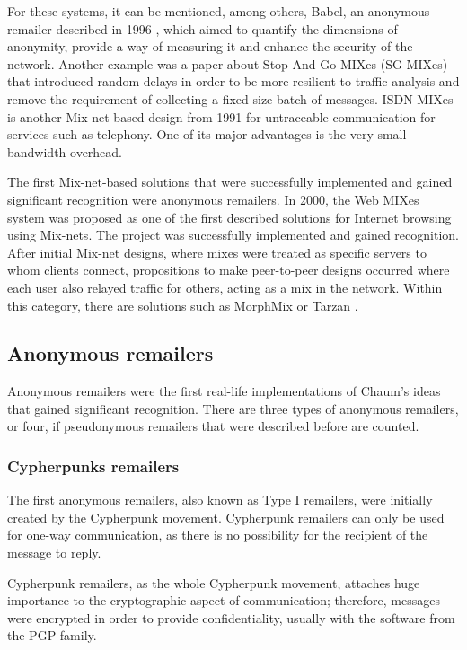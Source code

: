 For these systems, it can be mentioned, among others, Babel, an anonymous remailer described in 1996 \cite{babel}, which aimed to quantify the dimensions of anonymity, provide a way of measuring it and enhance the security of the network. Another example was a paper about Stop-And-Go MIXes (SG-MIXes) \cite{stop-and-go} that introduced random delays in order to be more resilient to traffic analysis and remove the requirement of collecting a fixed-size batch of messages.
ISDN-MIXes \cite{Pfitzmann91} is another Mix-net-based design from 1991 for untraceable communication for services such as telephony. One of its major advantages is the very small bandwidth overhead.

The first Mix-net-based solutions that were successfully implemented and gained significant recognition were anonymous remailers.
In 2000, the Web MIXes system \cite{web-mixes} was proposed as one of the first described solutions for Internet browsing using Mix-nets. The project was successfully implemented and gained recognition.
After initial Mix-net designs, where mixes were treated as specific servers to whom clients connect, propositions to make peer-to-peer designs occurred where each user also relayed traffic for others, acting as a mix in the network. Within this category, there are solutions such as MorphMix \cite{morphmix} or Tarzan \cite{tarzan}.

\subsection{Anonymous remailers}
Anonymous remailers were the first real-life implementations of Chaum's ideas that gained significant recognition. There are three types of anonymous remailers, or four, if pseudonymous remailers that were described before are counted.

\subsubsection{Cypherpunks remailers}
The first anonymous remailers, also known as Type I remailers, were initially created by the Cypherpunk movement. Cypherpunk remailers can only be used for one-way communication, as there is no possibility for the recipient of the message to reply. 

Cypherpunk remailers, as the whole Cypherpunk movement, attaches huge importance to the cryptographic aspect of communication; therefore, messages were encrypted in order to provide confidentiality, usually with the software from the PGP family.

